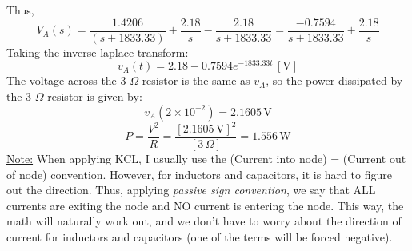 \documentclass[12pt]{article}
\begin{document}
Thus,
\[V_A(s) = \frac{1.4206}{(s+1833.33)} + \frac{2.18}{s} - \frac{2.18}{s+1833.33} = \frac{-0.7594}{s+1833.33}+\frac{2.18}{s}\]
Taking the inverse laplace transform:
\[\boxed{v_A(t) = 2.18 - 0.7594e^{-1833.33t}\,[\text{V}]}\]
The voltage across the 3 $\Omega$ resistor is the same as $v_A$, so the power dissipated by the 3 $\Omega$ resistor is given by:
\[v_A(2\times10^{-2}) = 2.1605\,\text{V}\]
\[P = \frac{V^2}{R} = \frac{[2.1605\,\text{V}]^2}{[3\,\Omega]} = \boxed{1.556\,\text{W}}\]
\underline{Note:} When applying KCL, I usually use the (Current into node) = (Current out of node) convention. However, for inductors and capacitors, it is hard to figure out the direction. Thus, applying \textit{passive sign convention}, we say that ALL currents are exiting the node and NO current is entering the node. This way, the math will naturally work out, and we don't have to worry about the direction of current for inductors and capacitors (one of the terms will be forced negative).
\end{document}
